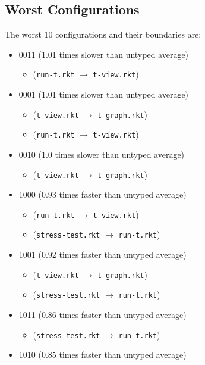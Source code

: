 \documentclass{article}
\newcommand{\mono}[1]{\texttt{#1}}
\begin{document}
\subsection{Worst Configurations}
The worst 10 configurations and their boundaries are:
\begin{itemize}
\item 0011 (1.01 times slower than untyped average)
  \begin{itemize}
  \item (\mono{run-t.rkt} $\rightarrow$ \mono{t-view.rkt})
  \end{itemize}
\item 0001 (1.01 times slower than untyped average)
  \begin{itemize}
  \item (\mono{t-view.rkt} $\rightarrow$ \mono{t-graph.rkt})
  \item (\mono{run-t.rkt} $\rightarrow$ \mono{t-view.rkt})
  \end{itemize}
\item 0010 (1.0 times slower than untyped average)
  \begin{itemize}
  \item (\mono{t-view.rkt} $\rightarrow$ \mono{t-graph.rkt})
  \end{itemize}
\item 1000 (0.93 times faster than untyped average)
  \begin{itemize}
  \item (\mono{run-t.rkt} $\rightarrow$ \mono{t-view.rkt})
  \item (\mono{stress-test.rkt} $\rightarrow$ \mono{run-t.rkt})
  \end{itemize}
\item 1001 (0.92 times faster than untyped average)
  \begin{itemize}
  \item (\mono{t-view.rkt} $\rightarrow$ \mono{t-graph.rkt})
  \item (\mono{stress-test.rkt} $\rightarrow$ \mono{run-t.rkt})
  \end{itemize}
\item 1011 (0.86 times faster than untyped average)
  \begin{itemize}
  \item (\mono{stress-test.rkt} $\rightarrow$ \mono{run-t.rkt})
  \end{itemize}
\item 1010 (0.85 times faster than untyped average)
  \begin{itemize}

\end{itemize}
\end{itemize}
\end{document}
